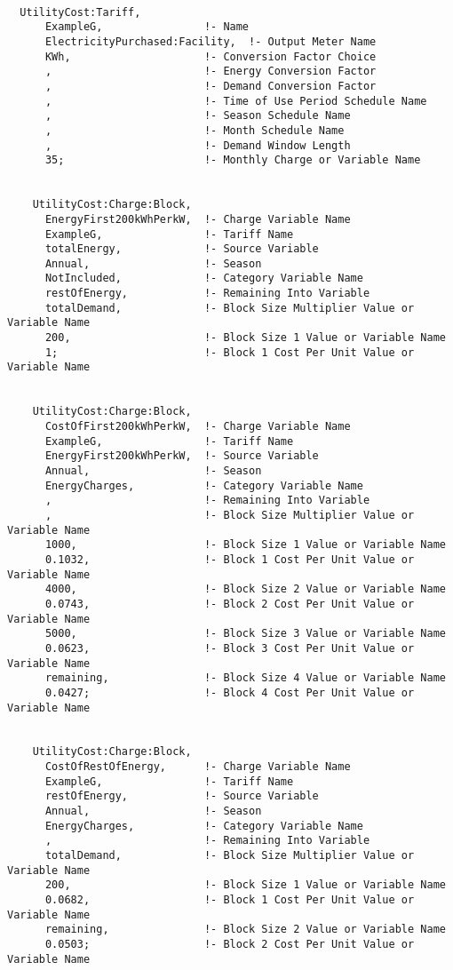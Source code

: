 \begin{lstlisting}

  UtilityCost:Tariff,
      ExampleG,                !- Name
      ElectricityPurchased:Facility,  !- Output Meter Name
      KWh,                     !- Conversion Factor Choice
      ,                        !- Energy Conversion Factor
      ,                        !- Demand Conversion Factor
      ,                        !- Time of Use Period Schedule Name
      ,                        !- Season Schedule Name
      ,                        !- Month Schedule Name
      ,                        !- Demand Window Length
      35;                      !- Monthly Charge or Variable Name


    UtilityCost:Charge:Block,
      EnergyFirst200kWhPerkW,  !- Charge Variable Name
      ExampleG,                !- Tariff Name
      totalEnergy,             !- Source Variable
      Annual,                  !- Season
      NotIncluded,             !- Category Variable Name
      restOfEnergy,            !- Remaining Into Variable
      totalDemand,             !- Block Size Multiplier Value or Variable Name
      200,                     !- Block Size 1 Value or Variable Name
      1;                       !- Block 1 Cost Per Unit Value or Variable Name


    UtilityCost:Charge:Block,
      CostOfFirst200kWhPerkW,  !- Charge Variable Name
      ExampleG,                !- Tariff Name
      EnergyFirst200kWhPerkW,  !- Source Variable
      Annual,                  !- Season
      EnergyCharges,           !- Category Variable Name
      ,                        !- Remaining Into Variable
      ,                        !- Block Size Multiplier Value or Variable Name
      1000,                    !- Block Size 1 Value or Variable Name
      0.1032,                  !- Block 1 Cost Per Unit Value or Variable Name
      4000,                    !- Block Size 2 Value or Variable Name
      0.0743,                  !- Block 2 Cost Per Unit Value or Variable Name
      5000,                    !- Block Size 3 Value or Variable Name
      0.0623,                  !- Block 3 Cost Per Unit Value or Variable Name
      remaining,               !- Block Size 4 Value or Variable Name
      0.0427;                  !- Block 4 Cost Per Unit Value or Variable Name


    UtilityCost:Charge:Block,
      CostOfRestOfEnergy,      !- Charge Variable Name
      ExampleG,                !- Tariff Name
      restOfEnergy,            !- Source Variable
      Annual,                  !- Season
      EnergyCharges,           !- Category Variable Name
      ,                        !- Remaining Into Variable
      totalDemand,             !- Block Size Multiplier Value or Variable Name
      200,                     !- Block Size 1 Value or Variable Name
      0.0682,                  !- Block 1 Cost Per Unit Value or Variable Name
      remaining,               !- Block Size 2 Value or Variable Name
      0.0503;                  !- Block 2 Cost Per Unit Value or Variable Name
\end{lstlisting}

